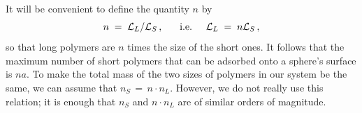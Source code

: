 \documentclass[journal=mamobx,manuscript=article]{achemso}
\newcommand{\leng}{\mathcal{L}}
\begin{document}
It will be convenient to define the quantity $n$ by \begin{equation}
   \label{eq.ndefn}
    n\;=\;\leng_L/\leng_S  \,,  \hspace{6mm}\hbox{i.e.}
     \hspace{5mm}  \leng_L  \;=\;  n\leng_S \,,
\end{equation}
so that
long polymers are $n$ times the size of the short ones.
It follows that the maximum number of short polymers
that can be adsorbed onto a sphere's surface is $na$.
To make the total mass of the two sizes of polymers in our system be the same, we can assume that $n_S \,=\, n\cdot n_L$.  However, we do not really use this relation; it is enough that $n_S$ and $n\cdot n_L$
are of similar orders of magnitude.
\end{document}
